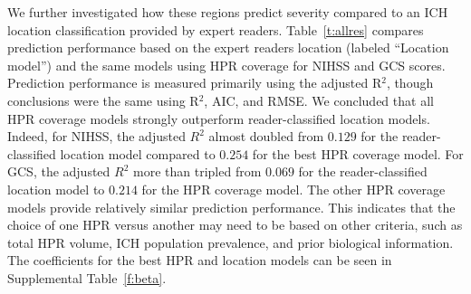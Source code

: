 \documentclass[10pt]{article}\usepackage[]{graphicx}\usepackage[]{color}
\begin{document}
We further investigated how these regions predict severity compared to an ICH location classification provided by expert readers. Table~\ref{t:allres} compares prediction performance based on the expert readers location (labeled ``Location model'') and the same models using HPR coverage for NIHSS and GCS scores.  Prediction performance is measured primarily using the adjusted R$^2$, though conclusions were the same using R$^2$, AIC, and RMSE. We concluded that all HPR coverage models strongly outperform reader-classified location models.  Indeed, for NIHSS, the adjusted $R^2$ almost doubled from $0.129$  for  the reader-classified location model compared to $0.254$ for the best HPR coverage model.  For GCS,
the adjusted $R^2$ more than tripled from $0.069$ for the reader-classified location model to $0.214$ for the HPR coverage model. The other HPR coverage models provide relatively similar prediction performance. This indicates that the choice of one HPR versus another may need to be based on other criteria, such as total HPR volume, ICH population prevalence, and prior biological information.  The coefficients for the best HPR and location models can be seen in Supplemental Table~\ref{f:beta}.

%
%
\end{document}
